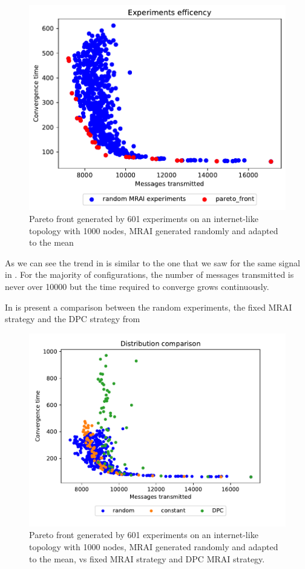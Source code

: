 \begin{figure}[h]
    \centering
    \includegraphics[width=.5\textwidth]{images/internet_like/1000/random.pdf}
	\caption{Pareto front generated by \num{601} experiments on an internet-like
	topology with \num{1000} nodes, \ac{MRAI} generated randomly and adapted to 
	the mean}
    \label{fig:random_pareto_front}
\end{figure}

As we can see the trend in  is similar to the one
that we saw for the same signal in .
For the majority of configurations, the number of messages transmitted is never
over \num{10000} but the time required to converge grows continuously.

In  is present a comparison between the random
experiments, the fixed \ac{MRAI} strategy and the \ac{DPC} strategy from

\begin{figure}[h]
    \centering
    \includegraphics[width=.5\textwidth]{images/internet_like/1000/random_vs_all.pdf}
	\caption{Pareto front generated by \num{601} experiments on an internet-like
	topology with \num{1000} nodes, \ac{MRAI} generated randomly and adapted to 
	the mean, vs fixed \ac{MRAI} strategy and \ac{DPC} \ac{MRAI} strategy.}
    \label{fig:pareto_comparison}
\end{figure}

